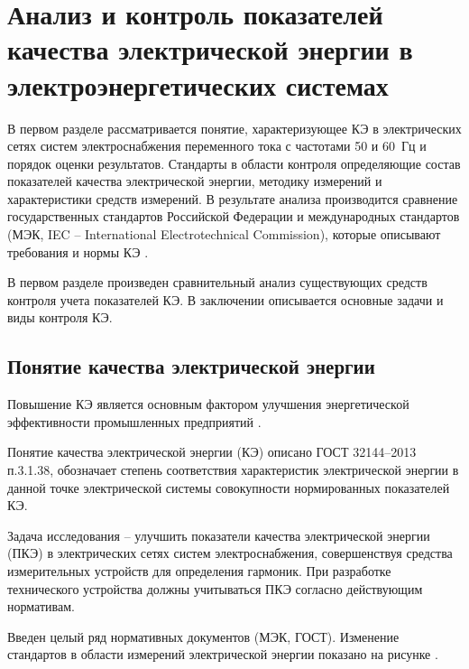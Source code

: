 \chapter{Анализ и контроль показателей качества электрической энергии в электроэнергетических системах}\label{ch:ch1}

В первом разделе рассматривается понятие, характеризующее КЭ в электрических сетях систем электроснабжения переменного тока с частотами 50 и 60~Гц и порядок оценки результатов. Стандарты в области контроля определяющие состав показателей качества электрической энергии, методику измерений и характеристики средств измерений. В результате анализа производится сравнение государственных стандартов Российской Федерации и международных стандартов (МЭК, IEC – International Electrotechnical Commission), которые описывают требования и нормы КЭ \cite{IEC}.

В первом разделе произведен сравнительный анализ существующих средств контроля учета показателей КЭ. В заключении описывается основные задачи и виды контроля КЭ.

\section{Понятие качества электрической энергии}\label{sec:ch1/sec1_1}
Повышение КЭ является основным фактором улучшения энергетической эффективности промышленных предприятий \cite{закон2009энергосбережении}. 

Понятие качества электрической энергии (КЭ) описано ГОСТ 32144–2013~\cite{ГОСТ32144-2013} п.3.1.38, обозначает степень соответствия характеристик электрической энергии в данной точке электрической системы совокупности нормированных показателей КЭ.

Задача исследования -- улучшить показатели качества электрической энергии (ПКЭ) в электрических сетях систем электроснабжения, совершенствуя средства измерительных устройств для определения гармоник. При разработке технического устройства должны учитываться ПКЭ  согласно действующим нормативам. 

Введен целый ряд нормативных документов (МЭК, ГОСТ). Изменение стандартов в области измерений электрической энергии показано на рисунке \cite{ГОСТ30804.4.30-2013, ГОСТ30804.4.7-2013, ГОСТ32144-2013, ГОСТР8.655-2009, ГОСТР51317.4.15-2012,ГОСТ33073-2014,ГОСТ8.622-2013}. 
 
